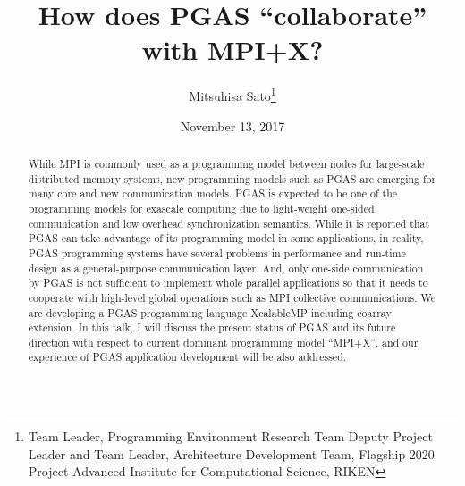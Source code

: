 \documentclass{article}
\title{How does PGAS “collaborate” with MPI+X?}
\author{Mitsuhisa Sato\thanks{Team Leader, Programming Environment Research Team
Deputy Project Leader and Team Leader, Architecture Development Team, 
Flagship 2020 Project
Advanced Institute for Computational Science, RIKEN}}
\date{November 13, 2017}
\begin{document}
\maketitle

\begin{abstract}
	While MPI is commonly used as a programming model between nodes for
	large-scale distributed memory systems, new programming models such as
	PGAS are emerging for many core and new communication models. PGAS is
	expected to be one of the programming models for exascale computing due to
	light-weight one-sided communication and low overhead synchronization
	semantics. While it is reported that PGAS can take advantage of its
	programming model in some applications, in reality, PGAS programming
	systems have several problems in performance and run-time design as a
	general-purpose communication layer. And, only one-side communication by
	PGAS is not sufficient to implement whole parallel applications so that
	it needs to cooperate with high-level global operations such as MPI
	collective communications. We are developing a PGAS programming language
	XcalableMP including coarray extension. In this talk, I will discuss the
	present status of PGAS and its future direction with respect to current
	dominant programming model “MPI+X”, and our experience of PGAS
	application development will be also addressed.

\end{abstract}
\end{document}
